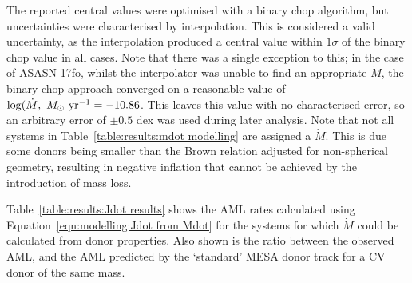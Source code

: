The reported central values were optimised with a binary chop algorithm, but uncertainties were characterised by interpolation. This is considered a valid uncertainty, as the interpolation produced a central value within $1\sigma$ of the binary chop value in all cases.
Note that there was a single exception to this; in the case of ASASN-17fo, whilst the interpolator was unable to find an appropriate $\dot M$, the binary chop approach converged on a reasonable value of $\log (\dot M,\ M_{\odot}\ {\rm yr}^{-1} = -10.86$. This leaves this value with no characterised error, so an arbitrary error of $\pm 0.5$ dex was used during later analysis.
Note that not all systems in Table~\ref{table:results:mdot modelling} are assigned a $\dot M$.
This is due some donors being smaller than the Brown relation adjusted for non-spherical geometry, resulting in negative inflation that cannot be achieved by the introduction of mass loss.

Table~\ref{table:results:Jdot results} shows the AML rates calculated using Equation~\ref{eqn:modelling:Jdot from Mdot} for the systems for which $\dot M$ could be calculated from donor properties. Also shown is the ratio between the observed AML, and the AML predicted by the `standard' MESA donor track for a CV donor of the same mass.

